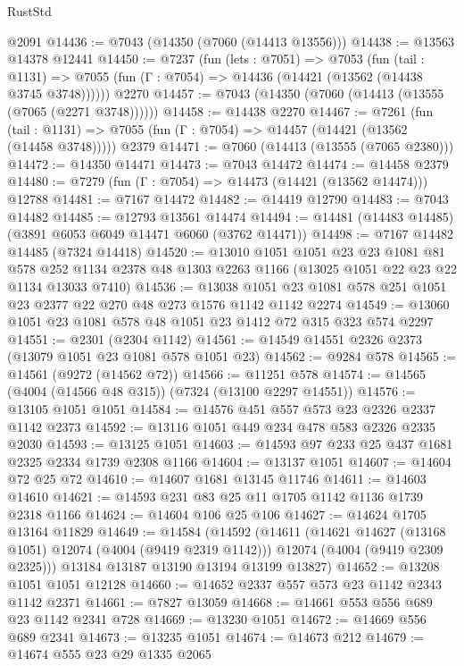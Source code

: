 \begin{lexlean}{RustStd}
\begin{coremodule}
    @2091
@14436 := @7043 (@14350 (@7060 (@14413 @13556)))
@14438 := @13563 @14378 @12441
@14450 := @7237
    (fun (lets : @7051) =>
    @7053
      (fun (tail : @1131) =>
      @7055 (fun (Γ : @7054) => @14436 (@14421 (@13562 (@14438 @3745 @3748))))))
    @2270
@14457 := @7043 (@14350 (@7060 (@14413 (@13555 (@7065 (@2271 @3748))))))
@14458 := @14438 @2270
@14467 := @7261
    (fun (tail : @1131) => @7055 (fun (Γ : @7054) => @14457 (@14421 (@13562 (@14458 @3748)))))
    @2379
@14471 := @7060 (@14413 (@13555 (@7065 @2380)))
@14472 := @14350 @14471
@14473 := @7043 @14472
@14474 := @14458 @2379
@14480 := @7279 (fun (Γ : @7054) => @14473 (@14421 (@13562 @14474))) @12788
@14481 := @7167 @14472
@14482 := @14419 @12790
@14483 := @7043 @14482
@14485 := @12793 @13561 @14474
@14494 := @14481 (@14483 @14485) (@3891 @6053 @6049 @14471 @6060 (@3762 @14471))
@14498 := @7167 @14482 @14485 (@7324 @14418)
@14520 := @13010
    @1051
    @1051
    @23
    @23
    @1081
    @81
    @578
    @252
    @1134
    @2378
    @48
    @1303
    @2263
    @1166
    (@13025 @1051 @22 @23 @22 @1134 @13033 @7410)
@14536 := @13038 @1051 @23 @1081 @578 @251 @1051 @23 @2377 @22 @270 @48 @273 @1576 @1142 @1142 @2274
@14549 := @13060 @1051 @23 @1081 @578 @48 @1051 @23 @1412 @72 @315 @323 @574 @2297
@14551 := @2301 (@2304 @1142)
@14561 := @14549 @14551 @2326 @2373 (@13079 @1051 @23 @1081 @578 @1051 @23)
@14562 := @9284 @578
@14565 := @14561 (@9272 (@14562 @72))
@14566 := @11251 @578
@14574 := @14565 (@4004 (@14566 @48 @315)) (@7324 (@13100 @2297 @14551))
@14576 := @13105 @1051 @1051
@14584 := @14576 @451 @557 @573 @23 @2326 @2337 @1142 @2373
@14592 := @13116 @1051 @449 @234 @478 @583 @2326 @2335 @2030
@14593 := @13125 @1051
@14603 := @14593 @97 @233 @25 @437 @1681 @2325 @2334 @1739 @2308 @1166
@14604 := @13137 @1051
@14607 := @14604 @72 @25 @72
@14610 := @14607 @1681 @13145 @11746
@14611 := @14603 @14610
@14621 := @14593 @231 @83 @25 @11 @1705 @1142 @1136 @1739 @2318 @1166
@14624 := @14604 @106 @25 @106
@14627 := @14624 @1705 @13164 @11829
@14649 := @14584
    (@14592
      (@14611
        (@14621 @14627 (@13168 @1051) @12074 (@4004 (@9419 @2319 @1142)))
        @12074
        (@4004 (@9419 @2309 @2325)))
      @13184
      @13187
      @13190
      @13194
      @13199
      @13827)
@14652 := @13208 @1051 @1051 @12128
@14660 := @14652 @2337 @557 @573 @23 @1142 @2343 @1142 @2371
@14661 := @7827 @13059
@14668 := @14661 @553 @556 @689 @23 @1142 @2341 @728
@14669 := @13230 @1051
@14672 := @14669 @556 @689 @2341
@14673 := @13235 @1051
@14674 := @14673 @212
@14679 := @14674 @555 @23 @29 @1335 @2065

\end{coremodule}
\end{lexlean}
